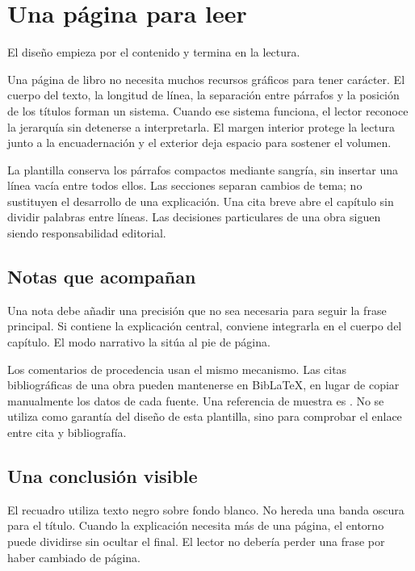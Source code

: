\chapter{Una página para leer}
\opening{El diseño empieza por el contenido y termina en la lectura.}
Una página de libro no necesita muchos recursos gráficos para tener carácter. El cuerpo del texto, la longitud de línea, la separación entre párrafos y la posición de los títulos forman un sistema. Cuando ese sistema funciona, el lector reconoce la jerarquía sin detenerse a interpretarla. El margen interior protege la lectura junto a la encuadernación y el exterior deja espacio para sostener el volumen.

La plantilla conserva los párrafos compactos mediante sangría, sin insertar una línea vacía entre todos ellos. Las secciones separan cambios de tema; no sustituyen el desarrollo de una explicación. Una cita breve abre el capítulo sin dividir palabras entre líneas. Las decisiones particulares de una obra siguen siendo responsabilidad editorial.

\section{Notas que acompañan}
Una nota debe añadir una precisión que no sea necesaria para seguir la frase principal. Si contiene la explicación central, conviene integrarla en el cuerpo del capítulo. El modo narrativo la sitúa al pie de página.

Los comentarios de procedencia usan el mismo mecanismo. Las citas bibliográficas de una obra pueden mantenerse en BibLaTeX, en lugar de copiar manualmente los datos de cada fuente. Una referencia de muestra es \textcite{lamport1994}. No se utiliza como garantía del diseño de esta plantilla, sino para comprobar el enlace entre cita y bibliografía.

\section{Una conclusión visible}
\begin{insightbox}
El recuadro utiliza texto negro sobre fondo blanco. No hereda una banda oscura para el título. Cuando la explicación necesita más de una página, el entorno puede dividirse sin ocultar el final. El lector no debería perder una frase por haber cambiado de página.
\end{insightbox}

